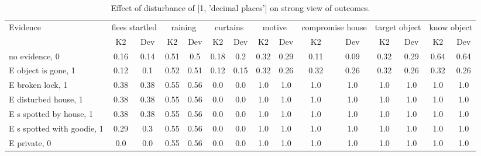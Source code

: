 \begin{table}\begin{tabular}{l|cc|cc|cc|cc|cc|cc|cc}\toprule\multirow{2}{*}{Evidence} & \multicolumn{2}{c}{flees startled}& \multicolumn{2}{c}{raining}& \multicolumn{2}{c}{curtains}& \multicolumn{2}{c}{motive}& \multicolumn{2}{c}{compromise house}& \multicolumn{2}{c}{target object}& \multicolumn{2}{c}{know object}\\& {K2} & {Dev}& {K2} & {Dev}& {K2} & {Dev}& {K2} & {Dev}& {K2} & {Dev}& {K2} & {Dev}& {K2} & {Dev}\\\midrule
no evidence, 0 & 0.16&0.14&0.51&0.5&0.18&0.2&0.32&0.29&0.11&0.09&0.32&0.29&0.64&0.64\\E object is gone, 1 & 0.12&0.1&0.52&0.51&0.12&0.15&\cellcolor{Bittersweet}0.32&\cellcolor{Bittersweet}0.26&\cellcolor{Bittersweet}0.32&\cellcolor{Bittersweet}0.26&\cellcolor{Bittersweet}0.32&\cellcolor{Bittersweet}0.26&\cellcolor{Bittersweet}0.32&\cellcolor{Bittersweet}0.26\\E broken lock, 1 & 0.38&0.38&0.55&0.56&0.0&0.0&1.0&1.0&1.0&1.0&1.0&1.0&1.0&1.0\\E disturbed house, 1 & 0.38&0.38&0.55&0.56&0.0&0.0&1.0&1.0&1.0&1.0&1.0&1.0&1.0&1.0\\E s spotted by house, 1 & 0.38&0.38&0.55&0.56&0.0&0.0&1.0&1.0&1.0&1.0&1.0&1.0&1.0&1.0\\E s spotted with goodie, 1 & 0.29&0.3&0.55&0.56&0.0&0.0&1.0&1.0&1.0&1.0&1.0&1.0&1.0&1.0\\E private, 0 & 0.0&0.0&0.55&0.56&0.0&0.0&1.0&1.0&1.0&1.0&1.0&1.0&1.0&1.0\\\bottomrule\end{tabular}\caption{Effect of disturbance of [1, 'decimal places'] on strong view of outcomes.}\end{table}